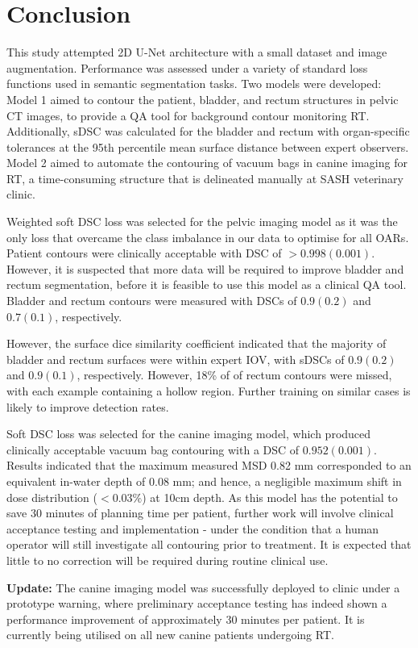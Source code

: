 \chapter{Conclusion}
\label{ch:conclusion}

This study attempted 2D U-Net architecture with a small dataset and image
augmentation. Performance was assessed under a variety of standard loss
functions used in semantic segmentation tasks. Two models were developed: Model
1 aimed to contour the patient, bladder, and rectum structures in pelvic CT
images, to provide a QA tool for background contour monitoring RT. Additionally,
sDSC was calculated for the bladder and rectum with organ-specific tolerances at
the 95th percentile mean surface distance between expert observers. Model 2
aimed to automate the contouring of vacuum bags in canine imaging for RT, a
time-consuming structure that is delineated manually at SASH veterinary clinic.

Weighted soft DSC loss was selected for the pelvic imaging model as it was the
only loss that overcame the class imbalance in our data to optimise for all
OARs. Patient contours were clinically acceptable with DSC of $>0.998(0.001)$.
However, it is suspected that more data will be required to improve bladder and
rectum segmentation, before it is feasible to use this model as a clinical QA
tool. Bladder and rectum contours were measured with DSCs of $0.9(0.2)$ and
$0.7(0.1)$, respectively.

However, the surface dice similarity coefficient indicated that the majority of
bladder and rectum surfaces were within expert IOV, with sDSCs of $0.9(0.2)$ and
$0.9(0.1)$, respectively. However, 18\% of of rectum contours were missed, with each
example containing a hollow region. Further training on similar cases is likely
to improve detection rates.

Soft DSC loss was selected for the canine imaging model, which produced
clinically acceptable vacuum bag contouring with a DSC of $0.952(0.001)$. Results
indicated that the maximum measured MSD 0.82 mm corresponded to an equivalent
in-water depth of 0.08 mm; and hence, a negligible maximum shift in dose
distribution ($<0.03\%$) at 10cm depth. As this model has the potential to save
30 minutes of planning time per patient, further work will involve clinical
acceptance testing and implementation - under the condition that a human
operator will still investigate all contouring prior to treatment. It is
expected that little to no correction will be required during routine clinical
use.

\textbf{Update:} The canine imaging model was successfully deployed to clinic
under a prototype warning, where preliminary acceptance testing has indeed shown
a performance improvement of approximately 30 minutes per patient. It is
currently being utilised on all new canine patients undergoing RT.